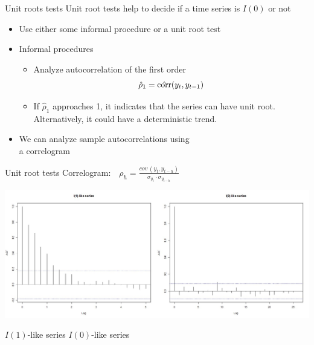 \documentclass{beamer}
\begin{document}
\begin{frame}{Unit roots tests}
Unit root tests help to decide if a time series is $I(0)$ or not
\vspace{0.4cm}
\begin{itemize}
\item Use either some informal procedure or a unit root test
\vspace{0.4cm}
\item Informal procedures
\begin{itemize}
\item Analyze autocorrelation of the first order
$$\hat{\rho}_1=\hat{\textnormal{corr}}(y_t,y_{t-1})$$
\item If $\hat{\rho}_1$ approaches 1, it indicates that the series can have unit root. Alternatively, it could have a deterministic trend.
\end{itemize}
\item We can analyze sample autocorrelations using \\a correlogram
\end{itemize}
\end{frame}
\begin{frame}{Unit root tests}
Correlogram:  
$\, \, \, \, \rho_h = \frac{\textit{cov} \, (y_t, y_{t-h})}{\sigma_{y_t} \cdot \sigma_{y_{t-h}}}$

\includegraphics[width=1\textwidth]{img/corelogramWeek2.jpg}

\hspace{1.5cm} $I(1)$-like series \hspace{3 cm} $I(0)$-like series
\end{frame}
\end{document}
